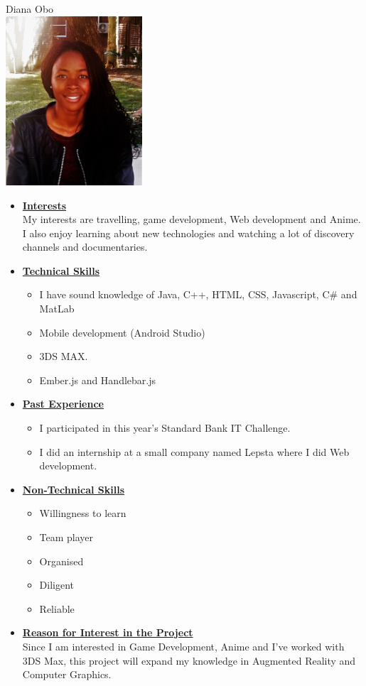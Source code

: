 \documentclass[a4paper,12pt]{article}
\begin{document}
\begin{center}
{\Large Diana {Obo}} \\[0.3cm]
\includegraphics[width= 2in]{Diana.jpg}\\[0.4cm] 
\end{center}

\begin{itemize}
\item {\large \underline{\textbf{Interests}}}\\[0.2cm]
My interests are travelling, game development, Web development and Anime. I also enjoy learning about new technologies and watching a lot of discovery channels and documentaries.

\item {\large \underline{\textbf{Technical Skills}}}
	\begin{itemize}
		\item I have sound knowledge of Java, C++, HTML, CSS, Javascript, C\# and MatLab
		\item Mobile development (Android Studio) 
		\item 3DS MAX.
		\item Ember.js and  Handlebar.js
	\end{itemize}
\bigskip
\item {\large \underline{\textbf{Past Experience}}}
\begin{itemize}
\item I participated in this year's Standard Bank IT Challenge.
\item I did an internship at a small company named Lepsta where I did Web development.
\end{itemize}
\bigskip
\item {\large \underline{\textbf{Non-Technical Skills}}}
\begin{itemize}
\item Willingness to learn
\item Team player
\item Organised
\item Diligent
\item Reliable
\end{itemize}
\bigskip
\item {\large \underline{\textbf{Reason for Interest in the Project}}}\\[0.2cm]
Since I am interested in Game Development, Anime and I’ve worked with 3DS Max, this project will expand my knowledge in Augmented Reality and Computer Graphics.

\end{itemize}
\end{document}
